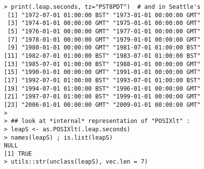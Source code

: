 \documentclass[11pt]{article} %
\begin{document}
\begin{framed}
\begin{verbatim}
> print(.leap.seconds, tz="PST8PDT")  # and in Seattle's
 [1] "1972-07-01 01:00:00 BST" "1973-01-01 00:00:00 GMT"
 [3] "1974-01-01 00:00:00 GMT" "1975-01-01 00:00:00 GMT"
 [5] "1976-01-01 00:00:00 GMT" "1977-01-01 00:00:00 GMT"
 [7] "1978-01-01 00:00:00 GMT" "1979-01-01 00:00:00 GMT"
 [9] "1980-01-01 00:00:00 GMT" "1981-07-01 01:00:00 BST"
[11] "1982-07-01 01:00:00 BST" "1983-07-01 01:00:00 BST"
[13] "1985-07-01 01:00:00 BST" "1988-01-01 00:00:00 GMT"
[15] "1990-01-01 00:00:00 GMT" "1991-01-01 00:00:00 GMT"
[17] "1992-07-01 01:00:00 BST" "1993-07-01 01:00:00 BST"
[19] "1994-07-01 01:00:00 BST" "1996-01-01 00:00:00 GMT"
[21] "1997-07-01 01:00:00 BST" "1999-01-01 00:00:00 GMT"
[23] "2006-01-01 00:00:00 GMT" "2009-01-01 00:00:00 GMT"
> 
> ## look at *internal* representation of "POSIXlt" :
> leapS <- as.POSIXlt(.leap.seconds)
> names(leapS) ; is.list(leapS)
NULL
[1] TRUE
> utils::str(unclass(leapS), vec.len = 7)
\end{verbatim}
\end{framed}
\end{document}
